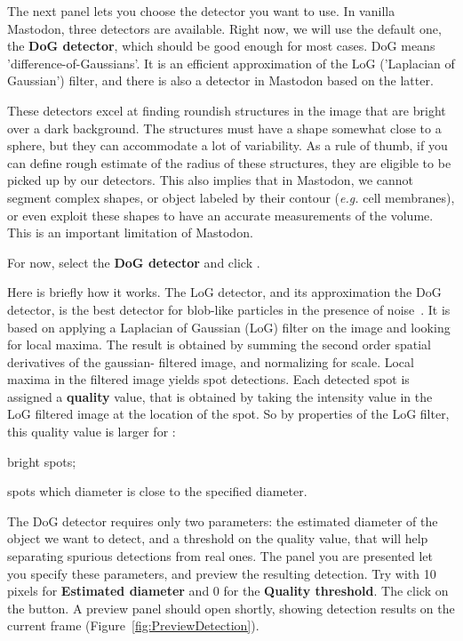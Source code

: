 The next panel lets you choose the detector you want to use.
In vanilla Mastodon, three detectors are available.
Right now, we will use the default one, the \textbf{DoG detector}, which should be good enough for most cases.
DoG means 'difference-of-Gaussians'.
It is an efficient approximation of the LoG ('Laplacian of Gaussian') filter, and there is also a detector in Mastodon based on the latter.

These detectors excel at finding roundish structures in the image that are bright over a dark background.
The structures must have a shape somewhat close to a sphere, but they can accommodate a lot of variability.
As a rule of thumb, if you can define rough estimate of the radius of these structures, they are eligible to be picked up by our detectors. 
This also implies that in Mastodon, we cannot segment complex shapes, or object labeled by their contour (\textit{e.g.} cell membranes), or even exploit these shapes to have an accurate measurements of the volume. 
This is an important limitation of Mastodon.

For now, select the \textbf{DoG detector} and click .

Here is briefly  how it works.
The LoG detector, and its approximation the DoG detector, is the best detector for blob-like particles in the presence of noise~\cite{Sage2005}. 
It is based on applying a Laplacian of Gaussian (LoG) filter on the image and looking for local maxima. The result is obtained by summing the second order spatial derivatives of the gaussian- filtered image, and normalizing for scale.
Local maxima in the filtered image yields spot detections. 
Each detected spot is assigned a \textbf{quality} value, that is obtained by taking the intensity value in the LoG filtered image at the location of the spot.
So by properties of the LoG filter, this quality value is larger for :
\begin{myitemize}
    \item bright spots;
    \item spots which diameter is close to the specified diameter.
\end{myitemize}

The DoG detector requires only two parameters: the estimated diameter of the object we want to detect, and a threshold on the quality value, that will help separating spurious detections from real ones. 
The panel you are presented let you specify these parameters, and preview the resulting detection.
Try with 10 pixels for \textbf{Estimated diameter} and 0 for the \textbf{Quality threshold}.
The click on the  button.
A preview panel should open shortly, showing detection results on the current frame (Figure~\ref{fig:PreviewDetection}).

